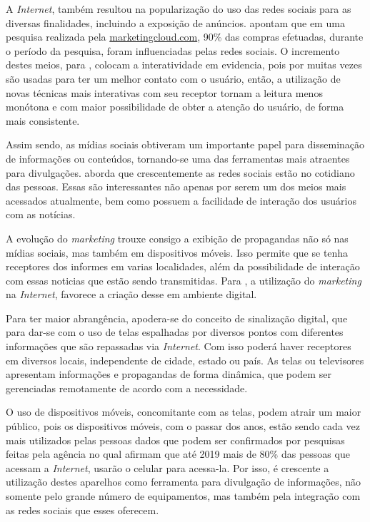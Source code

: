 A \textit{Internet}, também resultou na popularização do uso das redes sociais para as diversas finalidades, incluindo a exposição de anúncios. \cite{seo2017} apontam que em uma pesquisa realizada pela \url{marketingcloud.com}, 90\% das compras efetuadas, durante o período da pesquisa, foram influenciadas pelas redes sociais. O incremento destes meios, para \citet[p.2]{escobar2007}, colocam a interatividade em evidencia, pois por muitas vezes são usadas para ter um melhor contato com o usuário, então, a utilização de novas técnicas mais interativas com seu receptor tornam a leitura menos monótona e com maior possibilidade de obter a atenção do usuário, de forma mais consistente.

Assim sendo, as mídias sociais obtiveram um importante papel para disseminação de informações ou conteúdos, tornando-se uma das ferramentas mais atraentes para divulgações. \citet{rosa2010} aborda que crescentemente as redes sociais estão no cotidiano das pessoas. Essas são interessantes não apenas por serem um dos meios mais acessados atualmente, bem como possuem a facilidade de interação dos usuários com as notícias.

A evolução do \textit{marketing} trouxe consigo a exibição de propagandas não só nas mídias sociais, mas também em dispositivos móveis. Isso permite que se tenha receptores dos informes em varias localidades, além da possibilidade de interação com essas noticias que estão sendo transmitidas. Para \citet{santos2014}, a utilização do \textit{marketing} na \textit{Internet}, favorece a criação desse em ambiente digital.

Para ter maior abrangência, apodera-se do conceito de sinalização digital, que para \citet[p.37]{machado2010} dar-se com o uso de telas espalhadas por diversos pontos com diferentes informações que são repassadas via \textit{Internet}. Com isso poderá haver receptores em diversos locais, independente de cidade, estado ou país. As telas ou televisores apresentam informações e propagandas de forma dinâmica, que podem ser gerenciadas remotamente de acordo com a necessidade. 

O uso de dispositivos móveis, concomitante com as telas, podem atrair um maior público, pois os dispositivos móveis, com o passar dos anos, estão sendo cada vez mais utilizados pelas pessoas dados que podem ser confirmados por pesquisas feitas pela agência \cite{emarketer} no qual afirmam que até 2019 mais de 80\% das pessoas que acessam a \textit{Internet}, usarão o celular para acessa-la. Por isso, é crescente a utilização destes aparelhos como ferramenta para divulgação de informações, não somente pelo grande número de equipamentos, mas também pela integração com as redes sociais que esses oferecem. 

